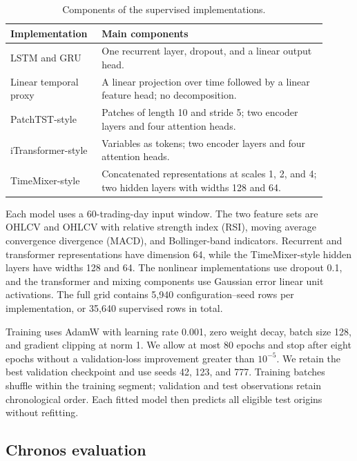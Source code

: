 \begin{table}[t]
\centering
\caption{Components of the supervised implementations.}
\label{tab:model_implementations}
\small
\begin{tabular}{>{\raggedright\arraybackslash}p{0.24\linewidth}>{\raggedright\arraybackslash}p{0.67\linewidth}}
\toprule
Implementation & Main components \\
\midrule
LSTM and GRU & One recurrent layer, dropout, and a linear output head. \\
Linear temporal proxy & A linear projection over time followed by a linear feature head; no decomposition. \\
PatchTST-style & Patches of length 10 and stride 5; two encoder layers and four attention heads. \\
iTransformer-style & Variables as tokens; two encoder layers and four attention heads. \\
TimeMixer-style & Concatenated representations at scales 1, 2, and 4; two hidden layers with widths 128 and 64. \\
\bottomrule
\end{tabular}
\end{table}

Each model uses a 60-trading-day input window. The two feature sets are OHLCV and OHLCV with relative strength index (RSI), moving average convergence divergence (MACD), and Bollinger-band indicators. Recurrent and transformer representations have dimension 64, while the TimeMixer-style hidden layers have widths 128 and 64. The nonlinear implementations use dropout 0.1, and the transformer and mixing components use Gaussian error linear unit activations. The full grid contains 5,940 configuration--seed rows per implementation, or 35,640 supervised rows in total.

Training uses AdamW with learning rate 0.001, zero weight decay, batch size 128, and gradient clipping at norm 1. We allow at most 80 epochs and stop after eight epochs without a validation-loss improvement greater than $10^{-5}$. We retain the best validation checkpoint and use seeds 42, 123, and 777. Training batches shuffle within the training segment; validation and test observations retain chronological order. Each fitted model then predicts all eligible test origins without refitting.

\subsection{Chronos evaluation}

